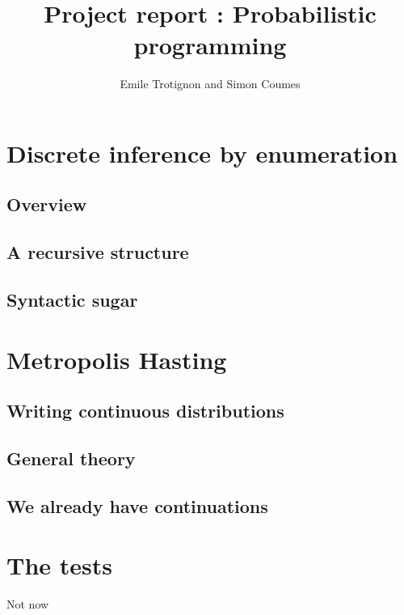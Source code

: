 \documentclass{article}
\title{Project report : Probabilistic programming}
\author{Emile Trotignon and Simon Coumes}
\newcommand\SC[1]{{\color{violet}{\it \bf Simon :} #1}}
\begin{document}
\maketitle

\section{Discrete inference by enumeration}

	\subsection{Overview}

	\subsection{A recursive structure}

	\subsection{Syntactic sugar}


\section{Metropolis Hasting}

	\subsection{Writing continuous distributions}

	\subsection{General theory}

	\subsection{We already have continuations}


\section{The tests}

\SC{Not now}
\end{document}

